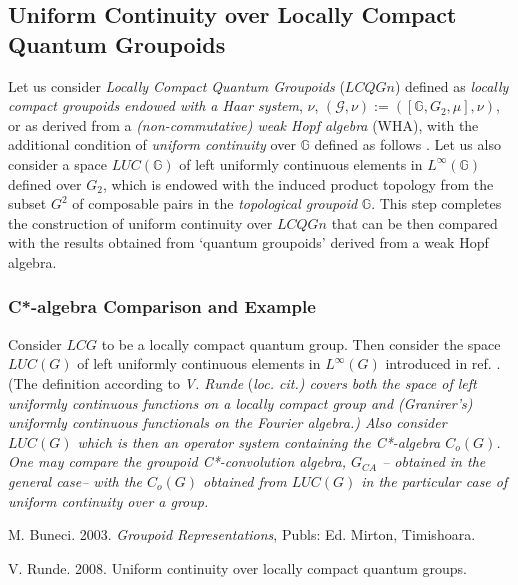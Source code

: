 \documentclass[12pt]{article}
\theoremstyle{plain}
\theoremstyle{definition}
\numberwithin{equation}{section}
\newcommand{\G}{\mathcal G}
\newcommand{\grp}{{\mathbb G}}
\begin{document}
\subsection{Uniform Continuity over Locally Compact Quantum Groupoids}

Let us consider \emph{Locally Compact Quantum Groupoids} ($LCQGn$) defined as {\em locally compact groupoids endowed with a Haar system}, $\nu$, $(\G,\nu):= ([\grp, G_2, \mu], \nu)$, or as derived from a {\em (non-commutative) weak Hopf algebra} (WHA), with the additional condition of \emph{uniform continuity} over $\grp$ defined as follows . Let us also consider a space $LUC(\grp)$ of left uniformly continuous elements in $L^{\infty}(\grp)$ defined over  $G_2$, which is endowed with the induced product topology from the subset $G^2$ of composable pairs in the \emph{topological groupoid} $\grp$. This step completes the construction of uniform continuity over $LCQGn$ that can be then compared with the results obtained from `quantum groupoids' derived from a weak Hopf algebra.  

\subsubsection{C*-algebra Comparison and Example}

  Consider $LCG$ to be a locally compact quantum group. Then consider the space $LUC(G)$ of left uniformly continuous elements in $L^{\infty}(G)$ introduced in ref. \cite{VRunde2k8}. (The definition according to {\em V. Runde} (\em loc. cit.) covers both the space of left uniformly continuous functions on a locally compact group and (Granirer's) uniformly continuous functionals on the Fourier algebra.) Also consider $LUC(G)$ which is then an {\em operator system containing the C*-algebra $C_o(G)$}. One may compare the groupoid C*-convolution algebra, $G_{CA}$ -- obtained in the general case-- with the  $C_o(G)$ obtained from $LUC(G)$ in the particular case of uniform continuity over a  group. 

\begin{thebibliography}{9} 
M. Buneci. 2003. {\em Groupoid Representations}, Publs: Ed. Mirton, Timishoara.

V. Runde. 2008. Uniform continuity over locally compact quantum groups. 

\end{thebibliography} 
\end{document}
